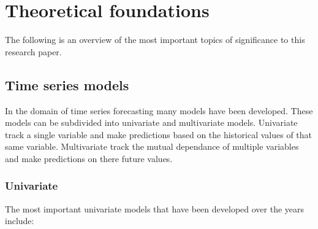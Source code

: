 \section{Theoretical foundations}\label{Theoretical foundations}

The following is an overview of the most important topics of significance to this research paper.

\subsection{Time series models}\label{Time series models}

In the domain of time series forecasting many models have been developed. These models can be subdivided into univariate and multivariate models. Univariate track a single variable and make predictions based on the historical values of that same variable. Multivariate track the mutual dependance of multiple variables and make predictions on there future values.

\subsubsection{Univariate}\label{Univariate}

The most important univariate models that have been developed over the years include:

